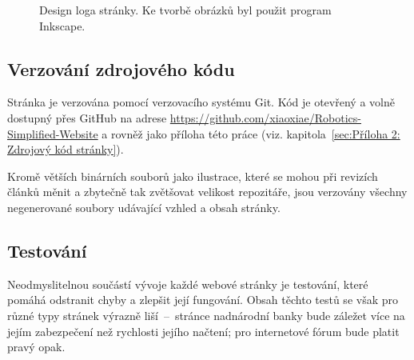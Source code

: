 \documentclass[a4paper, 12pt, twoside]{article}
\begin{document}
  \begin{figure}[H]%
    \centering

    \hfill
    \hfill

    \caption[Design loga stránky]{Design loga stránky. Ke tvorbě obrázků byl použit program Inkscape.}%
    \label{img:Design loga stránky}%
  \end{figure}



  \subsection{Verzování zdrojového kódu}
  Stránka je verzována pomocí verzovacího systému Git. Kód je otevřený a volně dostupný přes GitHub na adrese \url{https://github.com/xiaoxiae/Robotics-Simplified-Website} a rovněž jako příloha této práce (viz. kapitola~\ref{sec:Příloha 2: Zdrojový kód stránky}).

  Kromě větších binárních souborů jako ilustrace, které se mohou při revizích článků měnit a zbytečně tak zvětšovat velikost repozitáře, jsou verzovány všechny negenerované soubory udávající vzhled a obsah stránky.


  \subsection{Testování}
  Neodmyslitelnou součástí vývoje každé webové stránky je testování, které pomáhá odstranit chyby a zlepšit její fungování. Obsah těchto testů se však pro různé typy stránek výrazně liší~--~stránce nadnárodní banky bude záležet více na jejím zabezpečení než rychlosti jejího načtení; pro internetové fórum bude platit pravý opak.
\end{document}

